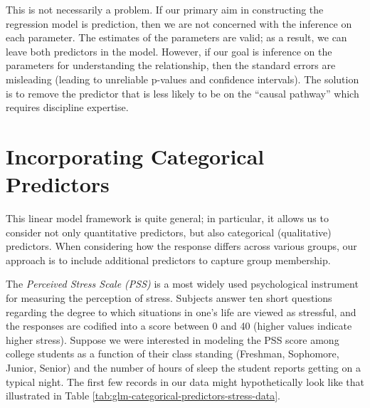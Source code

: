 \documentclass[
]{book}
\theoremstyle{plain}
\theoremstyle{mydefn}
\theoremstyle{myexmpl}
\theoremstyle{remark}
\begin{document}
This is not necessarily a problem. If our primary aim in constructing the regression model is prediction, then we are not concerned with the inference on each parameter. The estimates of the parameters are valid; as a result, we can leave both predictors in the model. However, if our goal is inference on the parameters for understanding the relationship, then the standard errors are misleading (leading to unreliable p-values and confidence intervals). The solution is to remove the predictor that is less likely to be on the ``causal pathway'' which requires discipline expertise.

\hypertarget{glm-categorical-predictors}{%
\chapter{Incorporating Categorical Predictors}\label{glm-categorical-predictors}}

This linear model framework is quite general; in particular, it allows us to consider not only quantitative predictors, but also categorical (qualitative) predictors. When considering how the response differs across various groups, our approach is to include additional predictors to capture group membership.

The \emph{Perceived Stress Scale (PSS)} is a most widely used psychological instrument for measuring the perception of
stress. Subjects answer ten short questions regarding the degree to which situations in one's life are viewed as stressful, and the responses are codified into a score between 0 and 40 (higher values indicate higher stress). Suppose we were interested in modeling the PSS score among college students as a function of their class standing (Freshman, Sophomore, Junior, Senior) and the number of hours of sleep the student reports getting on a typical night. The first few records in our data might hypothetically look like that illustrated in Table \ref{tab:glm-categorical-predictors-stress-data}.

\begin{table}

\caption{\label{tab:glm-categorical-predictors-stress-data}Hypothetical data on stress in college students.}
\centering
{}
\end{table}
\end{document}
